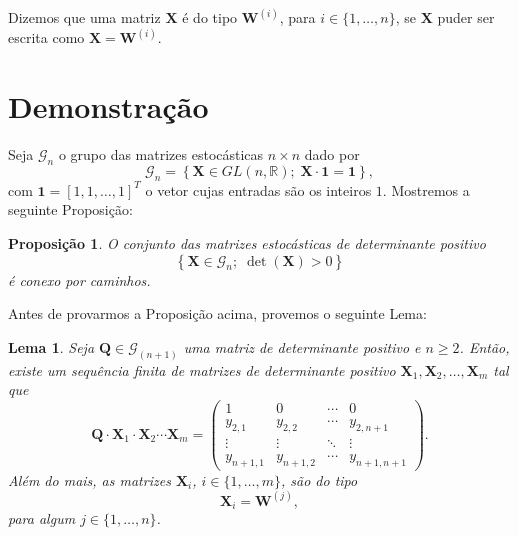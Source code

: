 \documentclass[twoside,openright,titlepage,numbers=noenddot,headinclude,  lineheaders footinclude=true,cleardoublepage=empty,
                                BCOR=5mm,paper=a4,fontsize=12pt ]{scrbook}
\newtheorem*{lema*}{Lema}
\newtheorem*{prop*}{Proposição}
\theoremstyle{definition}
\begin{document}
Dizemos que uma matriz $\mathbf{X}$ é do tipo $\mathbf{W}^{(i)}$,
para $i \in \{1, \ldots, n\}$, se $\mathbf{X}$ puder ser escrita
como
$\mathbf{X}= \mathbf{W}^{(i)}$.

\section{Demonstra\c{c}\~ao}
Seja $\mathcal{G}_n$ o grupo das matrizes estocásticas 
$n \times n$ dado por
\[
\mathcal{G}_n = \left\{ \mathbf{X} \in GL(n,\mathbb{R}); \;
					  \mathbf{X} \cdot \mathbf{1} = \mathbf{1} \right\},
\]
com $\mathbf{1} = [1, 1, \ldots, 1]^T$ 
o vetor cujas entradas são os inteiros $1$.
Mostremos a seguinte Proposição:

\begin{prop*}
O conjunto das matrizes estocásticas de determinante positivo
\[
\left\{ \mathbf{X} \in \mathcal{G}_n; \; \det(\mathbf{X}) > 0 \right\}
\]
é conexo por caminhos.
\end{prop*}

Antes de provarmos a Proposição acima, provemos o seguinte Lema:
\begin{lema*}
Seja $\mathbf{Q} \in \mathcal{G}_{(n+1)}$ uma matriz de 
determinante positivo e $n \geq 2$. Então, existe um 
sequência finita de matrizes de determinante positivo
 $\mathbf{X}_1, 
\mathbf{X}_2, \ldots, \mathbf{X}_m$ tal que
\[
\mathbf{Q} \cdot \mathbf{X}_1 \cdot
\mathbf{X}_2 \cdots
\mathbf{X}_m
=
\begin{pmatrix}
1 & 0 & \cdots & 0\\
y_{2,1} & y_{2,2} & \cdots & y_{2,n+1}\\
\vdots & \vdots & \ddots & \vdots\\
y_{n+1,1} & y_{n+1,2} & \cdots & y_{n+1,n+1}
\end{pmatrix}
.
\]
Além do mais, as matrizes $\mathbf{X}_i$, $ i \in 
\{1, \ldots, m\}$, são do tipo
\[
\mathbf{X}_i = \mathbf{W}^{(j)},
\]
para algum $j \in \{1, \ldots, n\}$.
\end{lema*}
\end{document}
